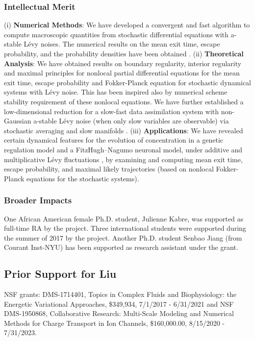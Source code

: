 \documentclass[11pt]{NSFamsart}
\begin{document}
\subsubsection*{Intellectual Merit}
(i)  \textbf{Numerical Methods}:
    We have developed a convergent and fast algorithm to compute macroscopic quantities from stochastic differential equations  with a-stable L\'evy noises. The numerical results on the mean   exit time, escape probability,  and the probability densities have been obtained \cite{ChenXL2020, GaoTing2016, Gao2016,     Wang2018NumericalAF}.
(ii)  \textbf{Theoretical Analysis}:
We have obtained results on  boundary regularity, interior regularity and maximal principles for   nonlocal partial differential equations for the mean   exit time,   escape probability and Fokker-Planck equation for stochastic dynamical systems with L\'evy noise. This has been inspired also by numerical scheme stability requirement of these nonlocal equations. We have further established a  low-dimensional reduction for a slow-fast data assimilation system with non-Gaussian a-stable L\'evy noise (when only slow variables are observable) via stochastic averaging and slow manifolds \cite{Lv2016OnAS,QiaoDuan2018,   ZhangZhuanDuan,ZhengDuan2017,ZhengYY2020}.
(iii)   \textbf{Applications}:
   We have revealed certain  dynamical features  for  the evolution of concentration in a genetic regulation model \cite{ChenWu} and a
   FitzHugh–Nagumo   neuronal model,   under additive and multiplicative     L\'evy fluctuations \cite{Liu2019LvyNI}, by examining and computing mean exit time, escape probability, and maximal likely trajectories (based on nonlocal Fokker-Planck equations for the stochastic systems).


 \subsubsection*{Broader Impacts}
 One African American female Ph.D. student, Julienne Kabre, was supported as full-time RA by the project. Three international students were supported during the summer of 2017 by the project.    Another Ph.D. student Senbao Jiang (from Courant Inst-NYU)  has been supported as research assistant under the grant. 
 

\subsection*{Prior Support for Liu} NSF grants: DMS-1714401,  Topics in Complex Fluids and Biophysiology: the Energetic Variational Approaches, \$349,934, 7/1/2017 - 6/31/2021 and 
{NSF DMS-1950868, Collaborative Research: Multi-Scale Modeling and Numerical Methods for Charge Transport in Ion Channels, \$160,000.00, 8/15/2020 - 7/31/2023.}
\end{document}
